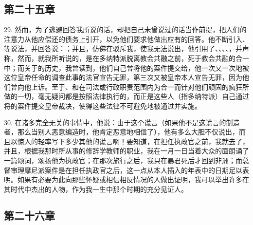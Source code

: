 
\subsection{第二十五章}

29. 然而，为了逃避回答我所说的话，却把自己未曾说过的话当作前提，把人们的注意力从他应偿还的债务上引开，以免他们要求他做出应有的回答。他不断引入、等说法，并回答说：；并且，仿佛在驳斥我，使我无法说出，他引用了、、、、，并声称，然而，就我所听说的，是在多纳特派脱离教会共融之前，死于教会共融的合一中；而关于的历史，我曾读到，他们自己曾将他的案件提交给，他一次又一次地被这位皇帝任命的调查此事的法官宣告无罪，第三次又被皇帝本人宣告无罪，因为他们曾向他上诉。至于、和在司法或行政职责范围内为合一而针对他们顽固的疯狂所做的一切，毫无疑问都是按照法律执行的，而正是这些人（指多纳特派）自己通过将的案件提交皇帝裁决，使得这些法律不可避免地被通过并实施。\par

30. 在诸多完全无关的事情中，他说：由于这个谎言（如果他不是这谎言的制造者，那么当别人恶意编造时，他肯定恶意地相信了），他有多么大胆不仅说出，而且以惊人的轻率写下多少其他的谎言啊！要知道，在担任执政官之前，我就去了，并且，根据我那时所从事的修辞学教师的职业，我在一月一日当着大众的面朗诵了一篇颂词，颂扬他为执政官；在那次旅行之后，我只在暴君死后才回到非洲；而总督审理摩尼派案件是在担任执政官之后，这一点从本人插入的年表中的日期足以表明。如果有必要为此向那些怀疑或相信相反情况的人做出证明，我可以举出许多在其时代中杰出的人物，作为我一生中那个时期的充分见证人。\par


\subsection{第二十六章}

